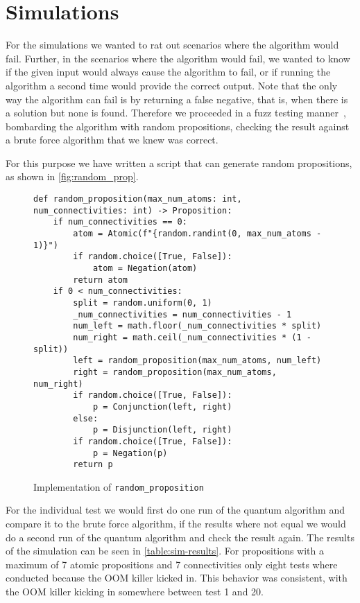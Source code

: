 \section{Simulations}\label{sec:simulations}

For the simulations we wanted to rat out scenarios where the algorithm would fail.
Further, in the scenarios where the algorithm would fail, we wanted to know if the given input would always cause the algorithm to fail, or if running the algorithm a second time would provide the correct output.
Note that the only way the algorithm can fail is by returning a false negative, that is, when there is a solution but none is found.
Therefore we proceeded in a fuzz testing manner~\cite{miller1990empirical}, bombarding the algorithm with random propositions, checking the result against a brute force algorithm that we knew was correct.

For this purpose we have written a script that can generate random propositions, as shown in \autoref{fig:random_prop}.

\begin{figure}[H]
\centering
\begin{verbatim}
def random_proposition(max_num_atoms: int, num_connectivities: int) -> Proposition:
    if num_connectivities == 0:
        atom = Atomic(f"{random.randint(0, max_num_atoms - 1)}")
        if random.choice([True, False]):
            atom = Negation(atom)
        return atom
    if 0 < num_connectivities:
        split = random.uniform(0, 1)
        _num_connectivities = num_connectivities - 1
        num_left = math.floor(_num_connectivities * split)
        num_right = math.ceil(_num_connectivities * (1 - split))
        left = random_proposition(max_num_atoms, num_left)
        right = random_proposition(max_num_atoms, num_right)
        if random.choice([True, False]):
            p = Conjunction(left, right)
        else:
            p = Disjunction(left, right)
        if random.choice([True, False]):
            p = Negation(p)
        return p
\end{verbatim}
\caption{Implementation of \texttt{random\_proposition} }
\label{fig:random_prop}
\end{figure}

For the individual test we would first do one run of the quantum algorithm and compare it to the brute force algorithm, if the results where not equal we would do a second run of the quantum algorithm and check the result again.
The results of the simulation can be seen in \autoref{table:sim-results}.
For propositions with a maximum of 7 atomic propositions and 7 connectivities only eight tests where conducted because the OOM killer kicked in.
This behavior was consistent, with the OOM killer kicking in somewhere between test 1 and 20.

